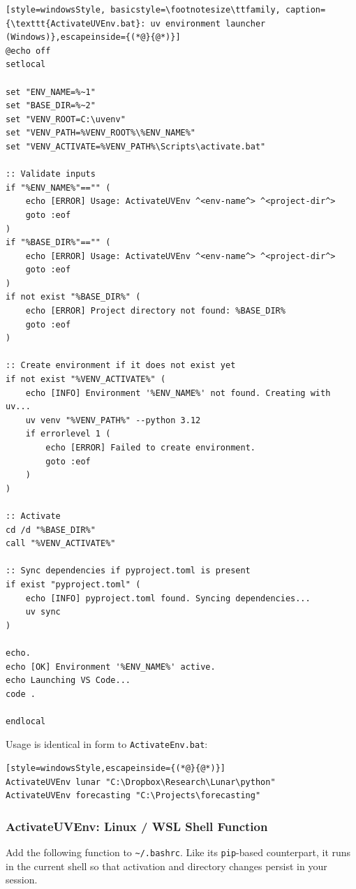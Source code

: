 \begin{lstlisting}[style=windowsStyle, basicstyle=\footnotesize\ttfamily, caption={\texttt{ActivateUVEnv.bat}: uv environment launcher (Windows)},escapeinside={(*@}{@*)}]
@echo off
setlocal

set "ENV_NAME=%~1"
set "BASE_DIR=%~2"
set "VENV_ROOT=C:\uvenv"
set "VENV_PATH=%VENV_ROOT%\%ENV_NAME%"
set "VENV_ACTIVATE=%VENV_PATH%\Scripts\activate.bat"

:: Validate inputs
if "%ENV_NAME%"=="" (
    echo [ERROR] Usage: ActivateUVEnv ^<env-name^> ^<project-dir^>
    goto :eof
)
if "%BASE_DIR%"=="" (
    echo [ERROR] Usage: ActivateUVEnv ^<env-name^> ^<project-dir^>
    goto :eof
)
if not exist "%BASE_DIR%" (
    echo [ERROR] Project directory not found: %BASE_DIR%
    goto :eof
)

:: Create environment if it does not exist yet
if not exist "%VENV_ACTIVATE%" (
    echo [INFO] Environment '%ENV_NAME%' not found. Creating with uv...
    uv venv "%VENV_PATH%" --python 3.12
    if errorlevel 1 (
        echo [ERROR] Failed to create environment.
        goto :eof
    )
)

:: Activate
cd /d "%BASE_DIR%"
call "%VENV_ACTIVATE%"

:: Sync dependencies if pyproject.toml is present
if exist "pyproject.toml" (
    echo [INFO] pyproject.toml found. Syncing dependencies...
    uv sync
)

echo.
echo [OK] Environment '%ENV_NAME%' active.
echo Launching VS Code...
code .

endlocal
\end{lstlisting}

Usage is identical in form to \texttt{ActivateEnv.bat}:

\begin{lstlisting}[style=windowsStyle,escapeinside={(*@}{@*)}]
ActivateUVEnv lunar "C:\Dropbox\Research\Lunar\python"
ActivateUVEnv forecasting "C:\Projects\forecasting"
\end{lstlisting}

\subsubsection{ActivateUVEnv: Linux / WSL Shell Function}

Add the following function to \texttt{\textasciitilde/.bashrc}. Like
its \texttt{pip}-based counterpart, it runs in the current shell so
that activation and directory changes persist in your session.

